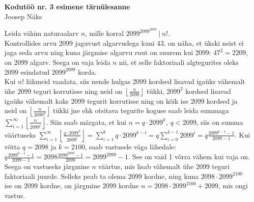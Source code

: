 \documentclass[a4paper, 10pt]{article}
\begin{document}
\begin{center}
\Large\textbf{Kodutöö nr. 3 esimene tärnülesanne}\\
\small{Joosep Näks}
\end{center}


\noindent Leida vähim naturaalarv $n$, mille korral $2099^{2099^{2099}}\ |\ n!$.\\

\bigskip
Kontrollides arvu 2099 jaguvust algarvudega kuni 43, on näha, et ükski neist ei jaga seda arvu ning kuna järgmise algarvu ruut on suurem kui 2099: $47^2=2209$, on 2099 algarv. Seega on vaja leida $n$ nii, et selle faktoriaali algtegurites oleks 2099 esindatud $2099^{2099}$ korda.\\
Kui $n!$ liikmeid vaadata, siis nende hulgas 2099 kordsed lisavad igaüks vähemalt ühe 2099 teguri korrutisse ning neid on $\left\lfloor\frac n{2099}\right\rfloor$ tükki, $2099^2$ kordsed lisavad igaüks vähemalt kaks 2099 tegurit korrutisse ning on kõik ise 2099 kordsed ja neid on $\left\lfloor\frac n{2099^2}\right\rfloor$ tükki jne ehk otsitava tegurite koguse saab leida summaga $\sum_{i=1}^\infty \left\lfloor\frac {n}{2099^i}\right\rfloor$. Siin saab märgata, et kui $n=q\cdot2099^k,\ q<2099$, siis on summa väärtuseks $\sum_{i=1}^\infty \left\lfloor\frac {q\cdot2099^k}{2099^i}\right\rfloor=\sum_{i=1}^k q\cdot2099^{k-i}=q\sum_{i=0}^{k-1} 2099^i=q\frac{2099^{k-1}-1}{2099-1}$. Kui võtta $q=2098$ ja $k=2100$, saab vastusele väga lähedale: $q\frac{2099^{k-1}-1}{2099-1}=2098\frac{2099^{2099}-1}{2098}=2099^{2099}-1$. See on vaid 1 võrra vähem kui vaja on. Seega on vastuseks järgmine $n$ väärtus, mis lisab vähemalt ühe 2099 teguri faktoriaali juurde. Selleks peab ta olema 2099 kordne, ning kuna $2098\cdot2099^{2100}$ ise on 2099 kordne, on järgmine 2099 kordne $n=2098\cdot2099^{2100}+2099$, mis ongi vastus.
\end{document}
